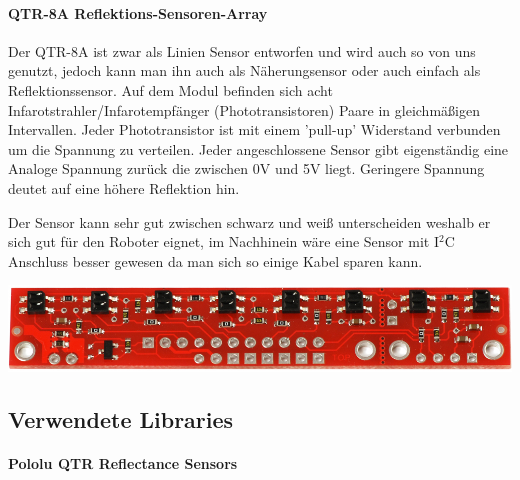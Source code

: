\documentclass[12pt]{article}
\begin{document}
\paragraph{QTR-8A Reflektions-Sensoren-Array} Der QTR-8A ist zwar als Linien Sensor entworfen und wird auch so von uns genutzt, jedoch kann man ihn auch als Näherungsensor oder auch einfach als Reflektionssensor. Auf dem Modul befinden sich acht Infarotstrahler/Infarotempfänger (Phototransistoren) Paare in gleichmäßigen Intervallen. Jeder Phototransistor ist mit einem 'pull-up' Widerstand verbunden um die Spannung zu verteilen. Jeder angeschlossene Sensor gibt eigenständig eine Analoge Spannung zurück die zwischen 0V und 5V liegt. Geringere Spannung deutet auf eine höhere Reflektion hin.

Der Sensor kann sehr gut zwischen schwarz und weiß unterscheiden weshalb er sich gut für den Roboter eignet, im Nachhinein wäre eine Sensor mit I$^2$C Anschluss besser gewesen da man sich so einige Kabel sparen kann.

\vspace{0.5cm}
\includegraphics[width=1\textwidth]{images/QTR-8A.jpg}\par
\cite{QTR8A-front}

\subsection{Verwendete Libraries}
\paragraph{Pololu QTR Reflectance Sensors}
\cite{QTR}



\end{document}
